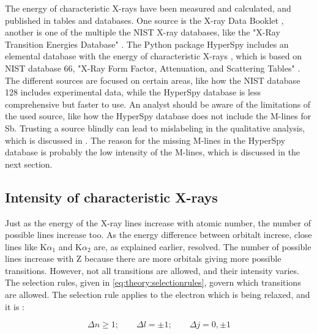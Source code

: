 The energy of characteristic X-rays have been measured and calculated, and published in tables and databases.
One source is the X-ray Data Booklet \cite{thompson_x-ray_2004}, another is one of the multiple the NIST X-ray databases, like the "X-Ray Transition Energies Database" \cite{nist_xraydatabase}.
The Python package HyperSpy includes an elemental database with the energy of characteristic X-rays \cite{hyperspy_1.7.1}, which is based on NIST database 66, "X-Ray Form Factor, Attenuation, and Scattering Tables" \cite{nist_xraydatabase_hyperspy}.
The different sources are focused on certain areas, like how the NIST database 128 includes experimental data, while the HyperSpy database is less comprehensive but faster to use.
An analyst should be aware of the limitations of the used source, like how the HyperSpy database does not include the M-lines for Sb.
Trusting a source blindly can lead to mislabeling in the qualitative analysis, which is discussed in .
The reason for the missing M-lines in the HyperSpy database is probably the low intensity of the M-lines, which is discussed in the next section.



\subsection{Intensity of characteristic X-rays}
\label{theory:xray_formation:intensity}

Just as the energy of the X-ray lines increase with atomic number, the number of possible lines increase too.
As the energy difference between orbitalt increse, close lines like K$\alpha_1$ and K$\alpha_2$ are, as explained earlier, resolved.
The number of possible lines increase with Z because there are more orbitals giving more possible transitions.
However, not all transitions are allowed, and their intensity varies.
The selection rules, given in \cref{eq:theory:selectionrules}, govern which transitions are allowed.
The selection rule applies to the electron which is being relaxed, and it is \cite[Sec. 8.2.2.2]{hollas_modern_2004}:

\begin{equation}
    \label{eq:theory:selectionrules}
    \Delta n \ge 1;\qquad \Delta l  = \pm 1;\qquad \Delta j = 0, \pm 1
\end{equation}


